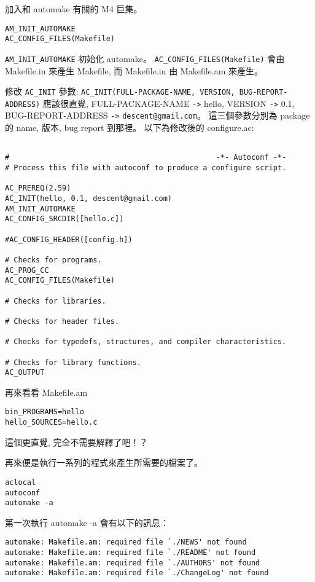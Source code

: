\documentclass[12pt,a4]{article}
\begin{document}
\begin{CJK}{UTF8}{cwmu}
加入和 automake 有關的 M4 巨集。
\begin{verbatim}
AM_INIT_AUTOMAKE
AC_CONFIG_FILES(Makefile)
\end{verbatim}

\verb+AM_INIT_AUTOMAKE+ 初始化 automake。
\verb+AC_CONFIG_FILES(Makefile)+ 會由 Makefile.in 來產生 Makefile,
而 Makefile.in 由 Makefile.am 來產生。


修改 \verb+AC_INIT+ 參數:
\verb+AC_INIT(FULL-PACKAGE-NAME, VERSION, BUG-REPORT-ADDRESS)+
應該很直覺, FULL-PACKAGE-NAME \verb+->+ hello,
VERSION \verb+->+ 0.1,
BUG-REPORT-ADDRESS \verb+->+ \verb+descent@gmail.com+。
這三個參數分別為 package 的 name, 版本, bug report 到那裡。
以下為修改後的 configure.ac:
\begin{verbatim}

#                                               -*- Autoconf -*-
# Process this file with autoconf to produce a configure script.

AC_PREREQ(2.59)
AC_INIT(hello, 0.1, descent@gmail.com)
AM_INIT_AUTOMAKE
AC_CONFIG_SRCDIR([hello.c])

#AC_CONFIG_HEADER([config.h])

# Checks for programs.
AC_PROG_CC
AC_CONFIG_FILES(Makefile)

# Checks for libraries.

# Checks for header files.

# Checks for typedefs, structures, and compiler characteristics.

# Checks for library functions.
AC_OUTPUT
\end{verbatim}

再來看看 Makefile.am

\begin{verbatim}
bin_PROGRAMS=hello
hello_SOURCES=hello.c
\end{verbatim}

這個更直覺, 完全不需要解釋了吧！？

再來便是執行一系列的程式來產生所需要的檔案了。

\begin{verbatim}
aclocal
autoconf
automake -a
\end{verbatim}

第一次執行 automake -a 會有以下的訊息：
\begin{verbatim}
automake: Makefile.am: required file `./NEWS' not found
automake: Makefile.am: required file `./README' not found
automake: Makefile.am: required file `./AUTHORS' not found
automake: Makefile.am: required file `./ChangeLog' not found
\end{verbatim}


\end{CJK}
\end{document}
